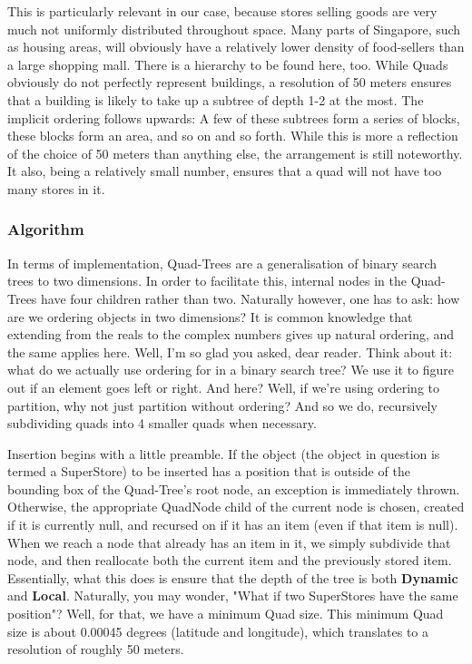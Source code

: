 \documentclass[12pt]{article}
\begin{document}
{This is particularly relevant in our case, because stores selling goods are very much not uniformly distributed throughout space. Many parts of Singapore, such as housing areas, will obviously have a relatively lower density of food-sellers than a large shopping mall. There is a hierarchy to be found here, too. While Quads obviously do not perfectly represent buildings, a resolution of 50 meters ensures that a building is likely to take up a subtree of depth 1-2 at the most. The implicit ordering follows upwards: A few of these subtrees form a series of blocks, these blocks form an area, and so on and so forth. While this is more a reflection of the choice of 50 meters than anything else, the arrangement is still noteworthy. It also, being a relatively small number, ensures that a quad will not have too many stores in it.

\subsubsection{Algorithm}

In terms of implementation, Quad-Trees are a generalisation of binary search trees to two dimensions. In order to facilitate this, internal nodes in the Quad-Trees have four children rather than two. Naturally however, one has to ask: how are we ordering objects in two dimensions? It is common knowledge that extending from the reals to the complex numbers gives up natural ordering, and the same applies here. Well, I'm so glad you asked, dear reader. Think about it: what do we actually use ordering for in a binary search tree? We use it to figure out if an element goes left or right. And here? Well, if we're using ordering to partition, why not just partition without ordering? And so we do, recursively subdividing quads into 4 smaller quads when necessary.

Insertion begins with a little preamble. If the object (the object in question is termed a SuperStore) to be inserted has a position that is outside of the bounding box of the Quad-Tree's root node, an exception is immediately thrown. Otherwise, the appropriate QuadNode child of the current node is chosen, created if it is currently null, and recursed on if it has an item (even if that item is null). When we reach a node that already has an item in it, we simply subdivide that node, and then reallocate both the current item and the previously stored item. Essentially, what this does is ensure that the depth of the tree is both \textbf{Dynamic} and \textbf{Local}. Naturally, you may wonder, "What if two SuperStores have the same position"? Well, for that, we have a minimum Quad size. This minimum Quad size is about 0.00045 degrees (latitude and longitude), which translates to a resolution of roughly 50 meters.

}
\end{document}
